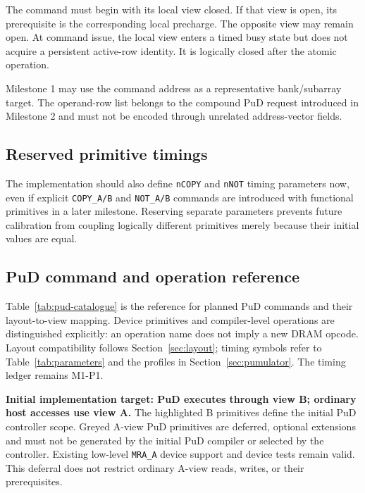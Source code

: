 \documentclass[9pt,twocolumn]{extarticle}
\newcommand{\cmd}[1]{\texttt{#1}}
\newcommand{\param}[1]{\texttt{#1}}
\newcommand{\timingrevision}{M1-P1}
\begin{document}
The command must begin with its local view closed. If that view is open, its
prerequisite is the corresponding local precharge. The opposite view may
remain open. At command issue, the local view enters a timed busy state but
does not acquire a persistent active-row identity. It is logically closed
after the atomic operation.

Milestone 1 may use the command address as a representative bank/subarray
target. The operand-row list belongs to the compound PuD request introduced in
Milestone 2 and must not be encoded through unrelated address-vector fields.

\subsection{Reserved primitive timings}

The implementation should also define \param{nCOPY} and \param{nNOT} timing
parameters now, even if explicit \cmd{COPY\_A/B} and \cmd{NOT\_A/B} commands
are introduced with functional primitives in a later milestone. Reserving
separate parameters prevents future calibration from coupling logically
different primitives merely because their initial values are equal.

\subsection{PuD command and operation reference}
\label{sec:pud-catalogue}

Table~\ref{tab:pud-catalogue} is the reference for planned PuD commands and
their layout-to-view mapping. Device primitives and compiler-level operations
are distinguished explicitly: an operation name does not imply a new DRAM
opcode. Layout compatibility follows Section~\ref{sec:layout}; timing symbols
refer to Table~\ref{tab:parameters} and the profiles in
Section~\ref{sec:pumulator}. The timing ledger remains \timingrevision{}.

\textbf{Initial implementation target: PuD executes through view B;
ordinary host accesses use view A.} The highlighted B primitives define the
initial PuD controller scope. Greyed A-view PuD primitives are deferred,
optional extensions and must not be generated by the initial PuD compiler
or selected by the controller. Existing low-level \cmd{MRA\_A} device
support and device tests remain valid. This deferral does not restrict
ordinary A-view reads, writes, or their prerequisites.
\end{document}
